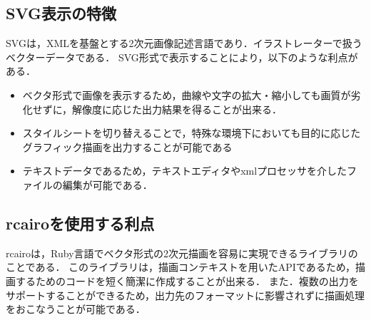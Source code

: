 \subsection{SVG表示の特徴}
SVGは，XMLを基盤とする2次元画像記述言語であり．イラストレーターで扱うベクターデータである\cite{SVG}．
SVG形式で表示することにより，以下のような利点がある．

\begin{itemize}
\item ベクタ形式で画像を表示するため，曲線や文字の拡大・縮小しても画質が劣化せずに，解像度に応じた出力結果を得ることが出来る．
\item スタイルシートを切り替えることで，特殊な環境下においても目的に応じたグラフィック描画を出力することが可能である
\item テキストデータであるため，テキストエディタやxmlプロセッサを介したファイルの編集が可能である．
\end{itemize}
\subsection{rcairoを使用する利点}
rcairoは，Ruby言語でベクタ形式の2次元描画を容易に実現できるライブラリのことである．
このライブラリは，描画コンテキストを用いたAPIであるため，描画するためのコードを短く簡潔に作成することが出来る．
また．複数の出力をサポートすることができるため，出力先のフォーマットに影響されずに描画処理をおこなうことが可能である\cite{rcairo}．

